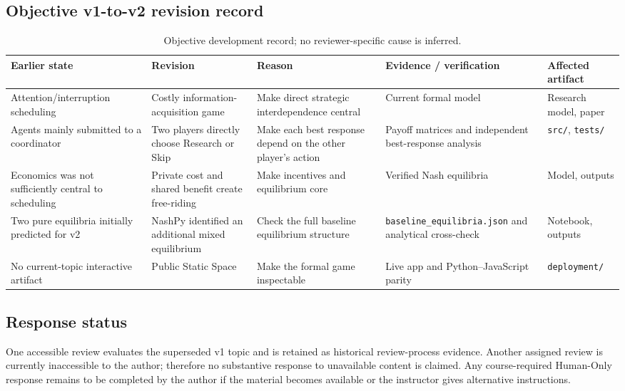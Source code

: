\subsection{Objective v1-to-v2 revision record}
\begin{table}[H]
\caption{Objective development record; no reviewer-specific cause is inferred.}
\begin{tabularx}{\textwidth}{@{}p{}p{}p{}p{}Y@{}}
\toprule
Earlier state & Revision & Reason & Evidence / verification & Affected artifact\\\midrule
Attention/interruption scheduling & Costly information-acquisition game & Make direct strategic interdependence central & Current formal model & Research model, paper\\
Agents mainly submitted to a coordinator & Two players directly choose Research or Skip & Make each best response depend on the other player's action & Payoff matrices and independent best-response analysis & \texttt{src/}, \texttt{tests/}\\
Economics was not sufficiently central to scheduling & Private cost and shared benefit create free-riding & Make incentives and equilibrium core & Verified Nash equilibria & Model, outputs\\
Two pure equilibria initially predicted for v2 & NashPy identified an additional mixed equilibrium & Check the full baseline equilibrium structure & \texttt{baseline\_equilibria.json} and analytical cross-check & Notebook, outputs\\
No current-topic interactive artifact & Public Static Space & Make the formal game inspectable & Live app and Python--JavaScript parity & \texttt{deployment/}\\
\bottomrule
\end{tabularx}
\end{table}

\subsection{Response status}
One accessible review evaluates the superseded v1 topic and is retained as historical review-process evidence. Another assigned review is currently inaccessible to the author; therefore no substantive response to unavailable content is claimed. Any course-required Human-Only response remains to be completed by the author if the material becomes available or the instructor gives alternative instructions.
